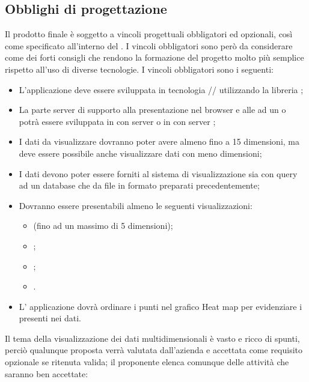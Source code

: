 \subsection{Obblighi di progettazione}
Il prodotto finale è soggetto a vincoli progettuali obbligatori ed opzionali, così come specificato all’interno del . I vincoli obbligatori sono però da considerare come dei forti consigli che rendono la formazione del progetto molto più semplice rispetto all'uso di diverse tecnologie.
I vincoli obbligatori sono i seguenti:
\begin{itemize}
	\item L'applicazione deve essere sviluppata in tecnologia // utilizzando la libreria ;
	\item La parte server di supporto alla presentazione nel browser e alle  ad un   o  potrà essere sviluppata in  con server  o in  con server ;
	\item I dati da visualizzare dovranno poter avere almeno fino a 15 dimensioni, ma deve essere possibile anche visualizzare dati con meno dimensioni;
	\item I dati devono poter essere forniti al sistema di visualizzazione sia con query ad un database che da file in formato  preparati precedentemente;
	\item Dovranno essere presentabili almeno le seguenti visualizzazioni:
	\begin{itemize}
		\item {} (fino ad un massimo di 5 dimensioni);
		\item {};
		\item {};
		\item {}.
	\end{itemize}
	\item L' applicazione dovrà ordinare i punti nel grafico Heat map per evidenziare i presenti nei dati.
\end{itemize}
Il tema della visualizzazione dei dati multidimensionali è vasto e ricco di spunti, perciò qualunque proposta verrà valutata dall'azienda e accettata come requisito opzionale se ritenuta valida; il proponente elenca comunque delle attività che saranno ben accettate:
